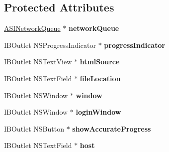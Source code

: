 \subsection*{\-Protected \-Attributes}
\begin{DoxyCompactItemize}
\item 
\hypertarget{interface_app_delegate_ace4db7985e177ab1da4defe90c2ccb7d}{
\hyperlink{interface_a_s_i_network_queue}{\-A\-S\-I\-Network\-Queue} $\ast$ {\bfseries network\-Queue}}
\label{interface_app_delegate_ace4db7985e177ab1da4defe90c2ccb7d}

\item 
\hypertarget{interface_app_delegate_af493e1bdff2e10dbdcf29819414dee0f}{
\-I\-B\-Outlet \-N\-S\-Progress\-Indicator $\ast$ {\bfseries progress\-Indicator}}
\label{interface_app_delegate_af493e1bdff2e10dbdcf29819414dee0f}

\item 
\hypertarget{interface_app_delegate_aec86b8bd351ccd57649327289806ebc9}{
\-I\-B\-Outlet \-N\-S\-Text\-View $\ast$ {\bfseries html\-Source}}
\label{interface_app_delegate_aec86b8bd351ccd57649327289806ebc9}

\item 
\hypertarget{interface_app_delegate_a90855c9cdf0140f358915f81f3c421f8}{
\-I\-B\-Outlet \-N\-S\-Text\-Field $\ast$ {\bfseries file\-Location}}
\label{interface_app_delegate_a90855c9cdf0140f358915f81f3c421f8}

\item 
\hypertarget{interface_app_delegate_ac7f25d6fc1aeb6beb3156a948f575fc6}{
\-I\-B\-Outlet \-N\-S\-Window $\ast$ {\bfseries window}}
\label{interface_app_delegate_ac7f25d6fc1aeb6beb3156a948f575fc6}

\item 
\hypertarget{interface_app_delegate_ae539a0272ffbb7e40ec9cbd472eeb7e5}{
\-I\-B\-Outlet \-N\-S\-Window $\ast$ {\bfseries login\-Window}}
\label{interface_app_delegate_ae539a0272ffbb7e40ec9cbd472eeb7e5}

\item 
\hypertarget{interface_app_delegate_a560fde14f494433f12d400bd9cb260e4}{
\-I\-B\-Outlet \-N\-S\-Button $\ast$ {\bfseries show\-Accurate\-Progress}}
\label{interface_app_delegate_a560fde14f494433f12d400bd9cb260e4}

\item 
\hypertarget{interface_app_delegate_ac20f98a6cd039911cd707658c9c4264a}{
\-I\-B\-Outlet \-N\-S\-Text\-Field $\ast$ {\bfseries host}}
\label{interface_app_delegate_ac20f98a6cd039911cd707658c9c4264a}


\end{DoxyCompactItemize}
